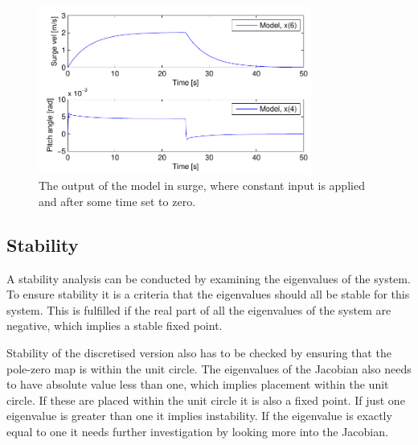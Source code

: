 \begin{figure}
  \centering
  \includegraphics[width=0.8\textwidth]{../../code/matlab/surgemodel}
  \caption{The output of the model in surge, where constant input is applied and after some time set to zero.}
  \label{fig:surgevel}
\end{figure}

\subsection{Stability}
A stability analysis can be conducted by examining the eigenvalues of the system. To ensure stability it is a criteria that the eigenvalues should all be stable for this system. This is fulfilled if the real part of all the eigenvalues of the system are negative, which implies a stable fixed point.

Stability of the discretised version also has to be checked by ensuring that the pole-zero map is within the unit circle. The eigenvalues of the Jacobian also needs to have absolute value less than one, which implies placement within the unit circle. If these are placed within the unit circle it is also a fixed point. If just one eigenvalue is greater than one it implies instability. If the eigenvalue is exactly equal to one it needs further investigation by looking more into the Jacobian.


